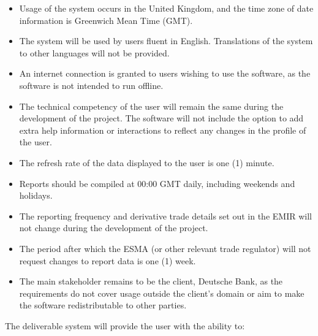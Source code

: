 \documentclass[8pt]{extarticle}
\begin{document}
\begin{itemize}
\item Usage of the system occurs in the United Kingdom, and the time zone of date information is Greenwich Mean Time (GMT). 

\item The system will be used by users fluent in English. Translations of the system to other languages will not be provided. 

\item An internet connection is granted to users wishing to use the software, as the software is not intended to run offline. 

\item The technical competency of the user will remain the same during the development of the project. The software will not include the option to add extra help information or interactions to reflect any changes in the profile of the user. 

\item The refresh rate of the data displayed to the user is one (1) minute. 

\item Reports should be compiled at 00:00 GMT daily, including weekends and holidays. 

\item The reporting frequency and derivative trade details set out in the EMIR will not change during the development of the project. 

\item The period after which the ESMA (or other relevant trade regulator) will not request changes to report data is one (1) week. 

\item The main stakeholder remains to be the client, Deutsche Bank, as the requirements do not cover usage outside the client’s domain or aim to make the software redistributable to other parties. 
\end{itemize}

\newpage

The deliverable system will provide the user with the ability to: 
\end{document}

